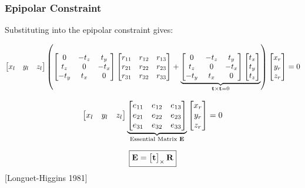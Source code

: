 \begin{frame}
    \frametitle{Epipolar Constraint}
    Substituting into the epipolar constraint gives:
    
    \begin{equation*}
        \begin{bmatrix} x_l & y_l & z_l \end{bmatrix}
        \left(
        \begin{bmatrix}
            0 & -t_z & t_y \\
            t_z & 0 & -t_x \\
            -t_y & t_x & 0
        \end{bmatrix}
        \begin{bmatrix}
            r_{11} & r_{12} & r_{13} \\
            r_{21} & r_{22} & r_{23} \\
            r_{31} & r_{32} & r_{33}
        \end{bmatrix}
        +
        \underbrace{
        \begin{bmatrix}
            0 & -t_z & t_y \\
            t_z & 0 & -t_x \\
            -t_y & t_x & 0
        \end{bmatrix}
        \begin{bmatrix} t_x \\ t_y \\ t_z \end{bmatrix}}_{\boldsymbol{\mathbf{t}} \times \boldsymbol{\mathbf{t}} = 0}
        \right)
        \begin{bmatrix} x_r \\ y_r \\ z_r \end{bmatrix} = 0
    \end{equation*}

    \begin{equation*}
        \begin{bmatrix} x_l & y_l & z_l \end{bmatrix}
        \underbrace{\begin{bmatrix}
            e_{11} & e_{12} & e_{13} \\
            e_{21} & e_{22} & e_{23} \\
            e_{31} & e_{32} & e_{33}
        \end{bmatrix}}_{\text{Essential Matrix } \boldsymbol{\mathbf{E}}}
        \begin{bmatrix} x_r \\ y_r \\ z_r \end{bmatrix} = 0
    \end{equation*}

    \begin{equation*}
        \boxed{\boldsymbol{\mathbf{E}} = \begin{bmatrix}\boldsymbol{\mathbf{t}}\end{bmatrix}_{\times} \boldsymbol{\mathbf{R}}}
    \end{equation*}
    \footnotesize{[Longuet-Higgins 1981]}
\end{frame}

